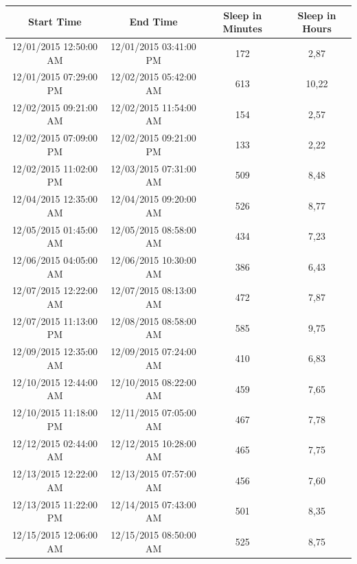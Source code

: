 \documentclass[12pt]{article} %
\begin{document}
\begin{table}[H]
\center
\begin{footnotesize}
	\begin{tabular}{| c | c | c | c |}
	\hline
	\textbf{Start Time} & \textbf{End Time} & \textbf{Sleep in Minutes} & \textbf{Sleep in Hours} \\
	\hline
12/01/2015 12:50:00 AM & 12/01/2015 03:41:00 PM & 172 & 2,87\\
	\hline
12/01/2015 07:29:00	PM & 12/02/2015 05:42:00 AM & 613 & 10,22\\
	\hline
12/02/2015 09:21:00	AM & 12/02/2015 11:54:00 AM & 154 & 2,57\\
	\hline
12/02/2015 07:09:00 PM & 12/02/2015 09:21:00 PM & 133 & 2,22\\
	\hline
12/02/2015 11:02:00 PM & 12/03/2015 07:31:00 AM & 509 & 8,48\\
	\hline
12/04/2015 12:35:00 AM & 12/04/2015 09:20:00 AM & 526 & 8,77\\
	\hline
\colorbox{blue!20}{12/05/2015 01:45:00 AM} & \colorbox{blue!20}{12/05/2015 08:58:00 AM} & \colorbox{blue!20}{434} & \colorbox{blue!20}{7,23}\\
	\hline
\colorbox{blue!30}{12/06/2015 04:05:00 AM} & \colorbox{blue!30}{12/06/2015 10:30:00 AM} & \colorbox{blue!30}{386} & \colorbox{blue!30}{6,43}\\
	\hline
12/07/2015 12:22:00 AM & 12/07/2015 08:13:00 AM & 472 & 7,87\\
	\hline
12/07/2015 11:13:00 PM & 12/08/2015 08:58:00 AM & 585 & 9,75\\
	\hline
12/09/2015 12:35:00 AM & 12/09/2015 07:24:00 AM & 410 & 6,83\\
	\hline
12/10/2015 12:44:00 AM & 12/10/2015 08:22:00 AM & 459 & 7,65\\
	\hline
12/10/2015 11:18:00 PM & 12/11/2015 07:05:00 AM & 467 & 7,78\\
	\hline
\colorbox{blue!20}{12/12/2015 02:44:00 AM} & \colorbox{blue!20}{12/12/2015 10:28:00 AM} & \colorbox{blue!20}{465} & \colorbox{blue!20}{7,75} \\
	\hline
\colorbox{blue!30}{12/13/2015 12:22:00 AM} & \colorbox{blue!30}{12/13/2015 07:57:00 AM} & \colorbox{blue!30}{456} & \colorbox{blue!30}{7,60}\\
	\hline
\colorbox{blue!30}{12/13/2015 11:22:00 PM} & \colorbox{blue!30}{12/14/2015 07:43:00 AM} & \colorbox{blue!30}{501} & \colorbox{blue!30}{8,35}\\
	\hline
12/15/2015 12:06:00 AM & 12/15/2015 08:50:00 AM & 525 & 8,75\\

\end{tabular}
\end{footnotesize}
\end{table}
\end{document}
